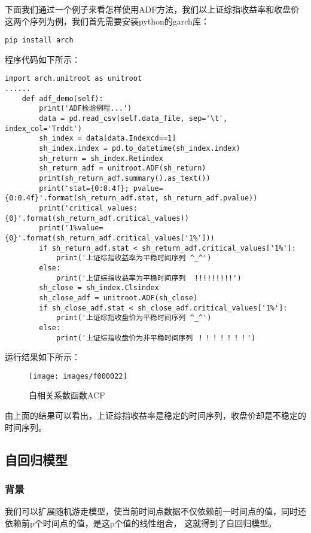 下面我们通过一个例子来看怎样使用ADF方法，我们以上证综指收益率和收盘价这两个序列为例，我们首先需要安装python的garch库：
\lstset{language=BASH}
\begin{lstlisting}
pip install arch
\end{lstlisting}
程序代码如下所示：
\begin{lstlisting}
import arch.unitroot as unitroot
......
    def adf_demo(self):
        print('ADF检验例程...')
        data = pd.read_csv(self.data_file, sep='\t', index_col='Trddt')
        sh_index = data[data.Indexcd==1]
        sh_index.index = pd.to_datetime(sh_index.index)
        sh_return = sh_index.Retindex
        sh_return_adf = unitroot.ADF(sh_return)
        print(sh_return_adf.summary().as_text())
        print('stat={0:0.4f}; pvalue={0:0.4f}'.format(sh_return_adf.stat, sh_return_adf.pvalue))
        print('critical_values:{0}'.format(sh_return_adf.critical_values))
        print('1%value={0}'.format(sh_return_adf.critical_values['1%']))
        if sh_return_adf.stat < sh_return_adf.critical_values['1%']:
            print('上证综指收益率为平稳时间序列 ^_^')
        else:
            print('上证综指收益率为平稳时间序列  !!!!!!!!!')
        sh_close = sh_index.Clsindex
        sh_close_adf = unitroot.ADF(sh_close)
        if sh_close_adf.stat < sh_close_adf.critical_values['1%']:
            print('上证综指收盘价为平稳时间序列 ^_^')
        else:
            print('上证综指收盘价为非平稳时间序列 ！！！！！！！')
\end{lstlisting}
运行结果如下所示：
\begin{figure}[H]
	\caption{自相关系数函数ACF}
	\label{f000022}
	\centering
	\texttt{[image: images/f000022]}
\end{figure}
由上面的结果可以看出，上证综指收益率是稳定的时间序列，收盘价却是不稳定的时间序列。
\subsection{自回归模型}
\subsubsection{背景}
我们可以扩展随机游走模型，使当前时间点数据不仅依赖前一时间点的值，同时还依赖前p个时间点的值，是这p个值的线性组合，
这就得到了自回归模型。
